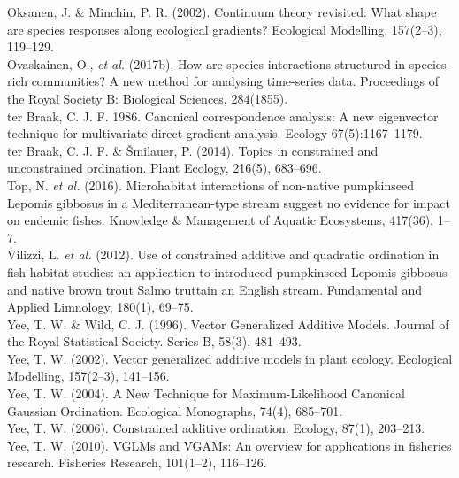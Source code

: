 \documentclass{article}
\begin{document}
Oksanen, J. \& Minchin, P. R. (2002). Continuum theory revisited: What shape are species responses along ecological gradients? Ecological Modelling, 157(2–3), 119–129.\\

Ovaskainen, O., \textit{et al.} (2017b). How are species interactions structured in species-rich communities? A new method for analysing time-series data. Proceedings of the Royal Society B: Biological Sciences, 284(1855).\\

ter Braak, C. J. F. 1986. Canonical correspondence analysis: A new eigenvector technique for multivariate direct gradient analysis. Ecology 67(5):1167–1179.\\ 

ter Braak, C. J. F. \& Šmilauer, P. (2014). Topics in constrained and unconstrained ordination. Plant Ecology, 216(5), 683–696.\\ 

Top, N. \textit{et al.} (2016). Microhabitat interactions of non-native pumpkinseed Lepomis gibbosus in a Mediterranean-type stream suggest no evidence for impact on endemic fishes. Knowledge \& Management of Aquatic Ecosystems, 417(36), 1–7.\\

Vilizzi, L. \textit{et al.} (2012). Use of constrained additive and quadratic ordination in fish habitat studies: an application to introduced pumpkinseed Lepomis gibbosus and native brown trout Salmo truttain an English stream. Fundamental and Applied Limnology, 180(1), 69–75. \\

Yee, T. W. \& Wild, C. J. (1996). Vector Generalized Additive Models. Journal of the Royal Statistical Society. Series B, 58(3), 481–493.\\

Yee, T. W. (2002). Vector generalized additive models in plant ecology. Ecological Modelling, 157(2–3), 141–156.\\

Yee, T. W. (2004). A New Technique for Maximum-Likelihood Canonical Gaussian Ordination. Ecological Monographs, 74(4), 685–701.\\

Yee, T. W. (2006). Constrained additive ordination. Ecology, 87(1), 203–213. \\

Yee, T. W. (2010). VGLMs and VGAMs: An overview for applications in fisheries research. Fisheries Research, 101(1–2), 116–126. \\
\end{document}
